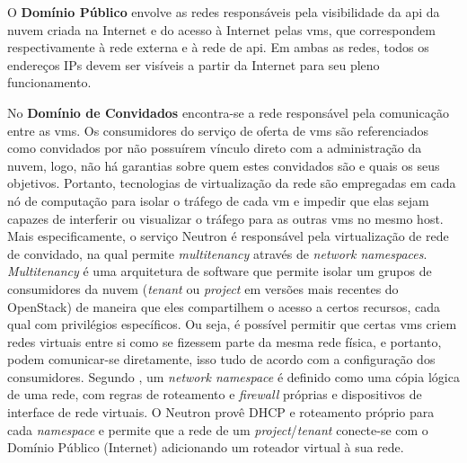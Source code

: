 O \textbf{Domínio Público} envolve as redes responsáveis pela visibilidade da \ac{api} da nuvem criada na Internet e do acesso à Internet pelas \acp{vm}, que correspondem respectivamente à rede externa e à rede de \ac{api}.
%
Em ambas as redes, todos os endereços IPs devem ser visíveis a partir da Internet para seu pleno funcionamento.

No \textbf{Domínio de Convidados} encontra-se a rede responsável pela comunicação entre as \acp{vm}. 
%
Os consumidores do serviço de oferta de \acp{vm} são referenciados como convidados por não possuírem vínculo direto com a administração da nuvem, logo, não há garantias sobre quem estes convidados são e quais os seus objetivos.
%
Portanto, tecnologias de virtualização da rede são empregadas em cada nó de computação para isolar o tráfego de cada \ac{vm} e impedir que elas sejam capazes de interferir ou visualizar o tráfego para as outras \acp{vm} no mesmo host. 
%
Mais especificamente, o serviço Neutron é responsável pela virtualização de rede de convidado, na qual permite \textit{multitenancy} através de \textit{network namespaces}.
%
\textit{Multitenancy} é uma arquitetura de software que permite isolar um grupos de consumidores da nuvem (\textit{tenant} ou \textit{project} em versões mais recentes do OpenStack) de maneira que eles compartilhem o acesso a certos recursos, cada qual com privilégios específicos.
%
Ou seja, é possível permitir que certas \acp{vm} criem redes virtuais entre si como se fizessem parte da mesma rede física, e portanto, podem comunicar-se diretamente, isso tudo de acordo com a configuração dos consumidores.
%
Segundo \cite{denton:2016:neutron}, um \textit{network namespace} é definido como uma cópia lógica de uma rede, com regras de roteamento e \textit{firewall} próprias e dispositivos de interface de rede virtuais.
%
O Neutron provê DHCP e roteamento próprio para cada \textit{namespace} e permite que a rede de um \textit{project}/\textit{tenant} conecte-se com o Domínio Público (Internet) adicionando um roteador virtual à sua rede.

